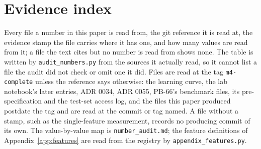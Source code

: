 \section{Evidence index}
\label{app:evidence}

Every file a number in this paper is read from, the git reference it is read at, the evidence stamp
the file carries where it has one, and how many values are read from it; a file the text cites but no number is read from shows none. The table is written by
\texttt{audit\_numbers.py} from the sources it actually read, so it cannot list a file the audit did
not check or omit one it did. Files are read at the tag \texttt{m4-complete} unless the reference says
otherwise: the learning curve, the lab notebook's later entries, ADR 0034, ADR 0055, PB-66's benchmark files,
its pre-specification and the test-set access log, and the files this paper produced postdate the tag and are read at the commit or tag named. A file without a stamp, such as the
single-feature measurement, records no producing commit of its own. The value-by-value map is
\texttt{number\_audit.md}; the feature definitions of Appendix~\ref{app:features} are read from the
registry by \texttt{appendix\_features.py}.

\begin{small}

\end{small}
